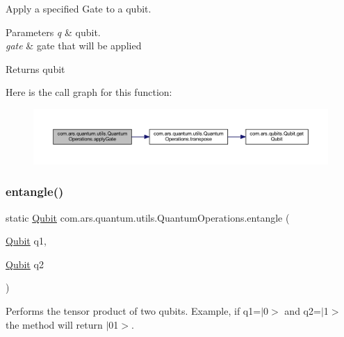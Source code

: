 Apply a specified Gate to a qubit.


\begin{DoxyParams}{Parameters}
{\em q} & qubit. \\
\hline
{\em gate} & gate that will be applied \\
\hline
\end{DoxyParams}
\begin{DoxyReturn}{Returns}
qubit 
\end{DoxyReturn}
Here is the call graph for this function\+:
\nopagebreak
\begin{figure}[H]
\begin{center}
\leavevmode
\includegraphics[width=350pt]{classcom_1_1ars_1_1quantum_1_1utils_1_1_quantum_operations_adbf2c6d628ae274e0c8e68d8712c2732_cgraph}
\end{center}
\end{figure}
\hypertarget{classcom_1_1ars_1_1quantum_1_1utils_1_1_quantum_operations_aea9e037d8e8f70173be3feb5ee89ddc4}{}\label{classcom_1_1ars_1_1quantum_1_1utils_1_1_quantum_operations_aea9e037d8e8f70173be3feb5ee89ddc4} 
\subsubsection{\texorpdfstring{entangle()}{entangle()}\hspace{0.1cm}{\footnotesize\ttfamily [1/2]}}
{\footnotesize\ttfamily static \hyperlink{classcom_1_1ars_1_1qubits_1_1_qubit}{Qubit} com.\+ars.\+quantum.\+utils.\+Quantum\+Operations.\+entangle (\begin{DoxyParamCaption}\item[{\hyperlink{classcom_1_1ars_1_1qubits_1_1_qubit}{Qubit}}]{q1,  }\item[{\hyperlink{classcom_1_1ars_1_1qubits_1_1_qubit}{Qubit}}]{q2 }\end{DoxyParamCaption})\hspace{0.3cm}{\ttfamily [static]}}

Performs the tensor product of two qubits. Example, if q1=$\vert$0$>$ and q2=$\vert$1$>$ the method will return $\vert$01$>$.


